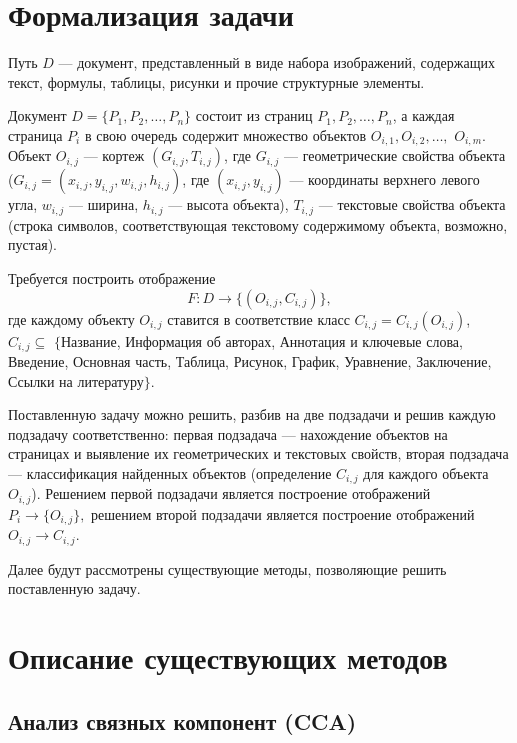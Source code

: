 \section{Формализация задачи}

Путь $ D $ --- документ, представленный в виде набора изображений, содержащих текст, формулы, таблицы, рисунки и прочие структурные элементы.

Документ $D = \{ P_1, P_2 , \dots, P_n \} $ состоит из страниц $ P_1, P_2, \dots, P_n $, а каждая страница
$ P_i $
в свою очередь содержит множество объектов $ O_{i,1}, O_{i,2}, \dots, $ $O_{i,m} $.
Объект $O_{i,j}$ --- кортеж $(G_{i,j}, T_{i,j})$, где $G_{i,j}$ --- геометрические свойства объекта ($G_{i,j} = (x_{i,j}, y_{i,j}, w_{i,j}, h_{i,j})$, где $(x_{i,j}, y_{i,j})$ --- координаты верхнего левого угла, $w_{i,j}$ --- ширина, $h_{i,j}$ --- высота объекта), $T_{i,j}$ --- текстовые свойства объекта (строка символов, соответствующая текстовому содержимому объекта, возможно, пустая).

Требуется построить отображение $$ F : D \to \{(O_{i,j}, C_{i,j})\}, $$ где каждому объекту $O_{i,j}$ ставится в соответствие класс $C_{i,j} = C_{i,j}(O_{i,j})$, $C_{i,j} \subseteq$ $\{${Название, Информация об авторах, Аннотация и ключевые слова, Введение, Основная часть, Таблица, Рисунок, График, Уравнение, Заключение, Ссылки на литературу}$\}$.

Поставленную задачу можно решить, разбив на две подзадачи и решив каждую подзадачу соответственно: первая подзадача --- нахождение объектов на страницах и выявление их геометрических и текстовых свойств, вторая подзадача --- классификация найденных объектов (определение $C_{i,j}$ для каждого объекта $O_{i,j}$).
Решением первой подзадачи является построение отображений
$
P_i \to \{ O_{i,j} \},
$
решением второй подзадачи является построение отображений
$
O_{i,j} \to C_{i,j}.
$

Далее будут рассмотрены существующие методы, позволяющие решить поставленную задачу.

\section{Описание существующих методов}

\subsection{Анализ связных компонент (CCA)}

